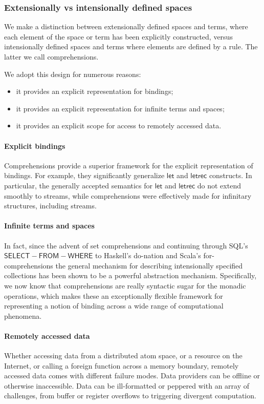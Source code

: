 \subsubsection{Extensionally vs intensionally defined spaces}
We make a distinction between extensionally defined spaces and terms, where each element of the space or term has been explicitly constructed, versus intensionally defined spaces and terms where elements are defined by a rule. The latter we call comprehensions.

We adopt this design for numerous reasons:
\begin{itemize}
  \item it provides an explicit representation for bindings;
  \item it provides an explicit representation for infinite terms and spaces;
  \item it provides an explicit scope for access to remotely accessed data.
\end{itemize}

\paragraph{Explicit bindings} Comprehensions provide a superior framework for the explicit representation of bindings. For example, they significantly generalize $\mathsf{let}$ and $\mathsf{letrec}$ constructs. In particular, the generally accepted semantics for $\mathsf{let}$ and $\mathsf{letrec}$ do not extend smoothly to streams, while comprehensions were effectively made for infinitary structures, including streams.

\paragraph{Infinite terms and spaces}
In fact, since the advent of set comprehensions and continuing through SQL's $\mathsf{SELECT-FROM-WHERE}$ to Haskell's do-nation and Scala's for-comprehensions the general mechanism for describing intensionally specified collections has been shown to be a powerful abstraction mechanism. Specifically, we now know that comprehensions are really syntactic sugar for the monadic operations, which makes these an exceptionally flexible framework for representing a notion of binding across a wide range of computational phenomena.

\paragraph{Remotely accessed data} Whether accessing data from a distributed atom space, or a resource on the Internet, or calling a foreign function across a memory boundary, remotely accessed data comes with different failure modes. Data providers can be offline or otherwise inaccessible. Data can be ill-formatted or peppered with an array of challenges, from buffer or register overflows to triggering divergent computation.

